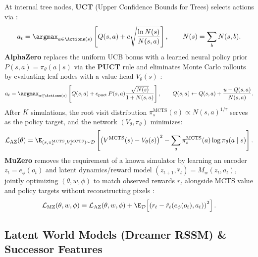 \documentclass[../../../../master.tex]{subfiles}
\begin{document}
\begin{coremath}
At internal tree nodes, \textbf{UCT} (Upper Confidence Bounds for Trees) selects actions via :
\begin{equation}
\label{eq:mbrl:uct}
a_t = \argmax_{a \in \Actions(s)} \left[ Q(s, a) + c \sqrt{\frac{\ln N(s)}{N(s, a)}} \right], \qquad N(s) = \sum_{b} N(s, b).
\end{equation}
\textbf{AlphaZero} replaces the uniform UCB bonus with a learned neural policy prior $P(s, a) = \pi_\theta(a \mid s)$ via the \textbf{PUCT} rule and eliminates Monte Carlo rollouts by evaluating leaf nodes with a value head $V_\theta(s)$ :
\begin{equation}
\label{eq:mbrl:puct}
a_t = \argmax_{a \in \Actions(s)} \left[ Q(s, a) + c_{\text{puct}}\, P(s, a) \frac{\sqrt{N(s)}}{1 + N(s, a)} \right], \qquad
Q(s, a) \leftarrow Q(s, a) + \frac{u - Q(s, a)}{N(s, a)}.
\end{equation}
After $K$ simulations, the root visit distribution $\pi^{\text{MCTS}}_s(a) \propto N(s, a)^{1/\tau}$ serves as the policy target, and the network $(V_\theta, \pi_\theta)$ minimizes:
\begin{equation}
\label{eq:mbrl:alphazero_loss}
\mathcal{L}_{\text{AZ}}(\theta) = \E_{(s, \pi^{\text{MCTS}}_s, V^{\text{MCTS}}_s) \sim \mathcal{D}} \left[ \left(V^{\text{MCTS}}(s) - V_\theta(s)\right)^2 - \sum_{a} \pi^{\text{MCTS}}_s(a) \log \pi_\theta(a \mid s) \right].
\end{equation}
\textbf{MuZero} removes the requirement of a known simulator by learning an encoder $z_t = e_\phi(o_t)$ and latent dynamics/reward model $(z_{t+1}, \hat{r}_t) = M_w(z_t, a_t)$, jointly optimizing $(\theta, w, \phi)$ to match observed rewards $r_t$ alongside MCTS value and policy targets without reconstructing pixels :
\begin{equation}
\label{eq:mbrl:muzero_loss}
\mathcal{L}_{\text{MZ}}(\theta, w, \phi) = \mathcal{L}_{\text{AZ}}(\theta, w, \phi) + \E_{\mathcal{D}}\!\left[\left(r_t - \hat{r}_t(e_\phi(o_t), a_t)\right)^2\right].
\end{equation}
\end{coremath}

\subsection{Latent World Models (Dreamer RSSM) \& Successor Features}
\label{sec:mbrl:dreamer_sf}
\end{document}
